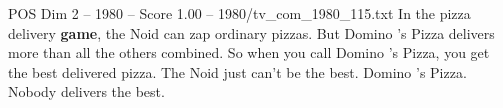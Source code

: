 \begin{textsample}{POS Dim 2 – 1980 – Score 1.00 – 1980/tv\_com\_1980\_115.txt}  \label{ex:f2_pos_069}
In the pizza delivery \textbf{game}, the Noid can zap ordinary pizzas.
But Domino 's Pizza delivers more than all the others combined.
So when you call Domino 's Pizza, you get the best delivered pizza.
The Noid just can't be the best.
Domino 's Pizza.
Nobody delivers the best.

\end{textsample}
